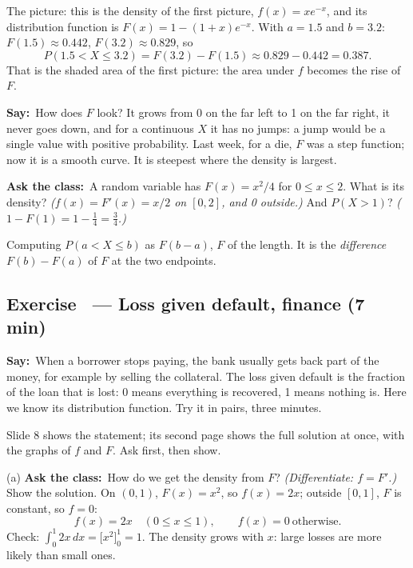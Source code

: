 \documentclass[11pt,a4paper,parskip=half]{scrartcl}
\renewcommand{\needspace}[1]{\Needspace{6\baselineskip}}
\newcommand{\say}{\textbf{\color{teal}Say:}\ }
\newcommand{\ask}{\textbf{\color{navy}Ask the class:}\ }
\begin{document}
The picture: this is the density of the first picture,
$f(x)=xe^{-x}$, and its distribution function is $F(x)=1-(1+x)e^{-x}$.
With $a=1.5$ and $b=3.2$: $F(1.5)\approx0.442$, $F(3.2)\approx0.829$, so
\[ P(1.5<X\le3.2)=F(3.2)-F(1.5)\approx0.829-0.442=0.387. \]
That is the shaded area of the first picture: the area under $f$ becomes
the rise of $F$.

\say How does $F$ look? It grows from 0 on the far left to 1 on the far
right, it never goes down, and for a continuous $X$ it has no jumps: a
jump would be a single value with positive probability. Last week, for a
die, $F$ was a step function; now it is a smooth curve. It is steepest
where the density is largest.

\ask A random variable has $F(x)=x^2/4$ for $0\le x\le2$. What is its
density? \emph{($f(x)=F'(x)=x/2$ on $[0,2]$, and 0 outside.)} And
$P(X>1)$? \emph{($1-F(1)=1-\tfrac14=\tfrac34$.)}

\begin{mistake}
	Computing $P(a<X\le b)$ as $F(b-a)$, $F$ of the length. It is the
	\emph{difference} $F(b)-F(a)$ of $F$ at the two endpoints.
\end{mistake}

\needspace{0.25\textheight}
\subsection{Exercise~ --- Loss given default, finance (7 min)}


\say When a borrower stops paying, the bank usually gets back part of
the money, for example by selling the collateral. The loss given default
is the fraction of the loan that is lost: 0 means everything is
recovered, 1 means nothing is. Here we know its distribution function.
Try it in pairs, three minutes.

\begin{slidecue}
	Slide 8 shows the statement; its second page shows the full solution at
	once, with the graphs of $f$ and $F$. Ask first, then show.
\end{slidecue}

(a) \ask How do we get the density from $F$? \emph{(Differentiate:
$f=F'$.)} Show the solution. On $(0,1)$, $F(x)=x^2$, so $f(x)=2x$; outside
$[0,1]$, $F$ is constant, so $f=0$:
\[ f(x)=2x\quad(0\le x\le1),\qquad f(x)=0\ \text{otherwise}. \]
Check: $\int_0^1 2x\,dx=\big[x^2\big]_0^1=1$. The density grows with $x$:
large losses are more likely than small ones.
\end{document}
